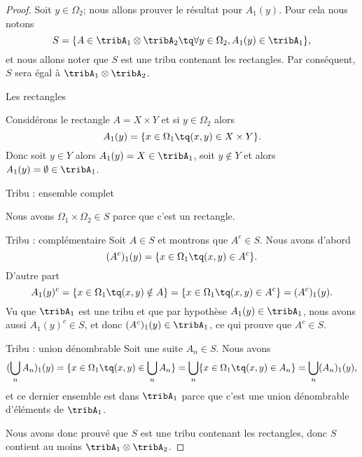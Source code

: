 \begin{proof}
    Soit \( y\in\Omega_2\); nous allons prouver le résultat pour \( A_1(y)\). Pour cela nous notons 
    \begin{equation}
        S=\{ A\in \tribA_1\otimes\tribA_2\tq \forall y\in\Omega_2, A_1(y)\in\tribA_1 \},
    \end{equation}
    et nous allons noter que \( S\) est une tribu contenant les rectangles. Par conséquent, \( S\) sera égal à \( \tribA_1\otimes \tribA_2\).

    \begin{subproof}
        \item[Les rectangles]

            Considérons le rectangle \( A=X\times Y\) et si \( y\in \Omega_2\) alors
            \begin{equation}
                A_1(y)=\{ x\in \Omega_1\tq (x,y)\in X\times Y \}.  
            \end{equation}
            Donc soit \( y\in Y\) alors \( A_1(y)=X\in\tribA_1\), soit \( y\notin Y\) et alors \( A_1(y)=\emptyset\in\tribA_1\).

        \item[Tribu : ensemble complet]

            Nous avons \( \Omega_1\times \Omega_2\in S\) parce que c'est un rectangle.

        \item[Tribu : complémentaire] Soit \( A\in S\) et montrons que \( A^c\in S\). Nous avons d'abord
            \begin{equation}
                (A^c)_1(y)=\{ x\in \Omega_1\tq (x,y)\in A^c \}.
            \end{equation}
            D'autre part
            \begin{equation}
                A_1(y)^c=\{ x\in\Omega_1\tq (x,y)\notin A \}=\{ x\in \Omega_1\tq (x,y)\in A^c \}=(A^c)_1(y).
            \end{equation}
            Vu que \( \tribA_1\) est une tribu et que par hypothèse \( A_1(y)\in\tribA_1\), nous avons aussi \( A_1(y)^c\in S\), et donc \( (A^c)_1(y)\in \tribA_1\), ce qui prouve que \( A^c\in S\).

        \item[Tribu : union dénombrable] Soit une suite \( A_n\in S\). Nous avons
            \begin{equation}
                (\bigcup_nA_n)_1(y)=\{ x\in\Omega_1\tq (x,y)\in \bigcup_nA_n \}=\bigcup_n\{ x\in\Omega_1\tq (x,y)\in A_n \}=\bigcup_n(A_n)_1(y),
            \end{equation}
            et ce dernier ensemble est dans \( \tribA_1\) parce que c'est une union dénombrable d'éléments de \( \tribA_1\).
        
    \end{subproof}
    Nous avons donc prouvé que \( S\) est une tribu contenant les rectangles, donc \( S\) contient au moins \( \tribA_1\otimes \tribA_2\).
\end{proof}

